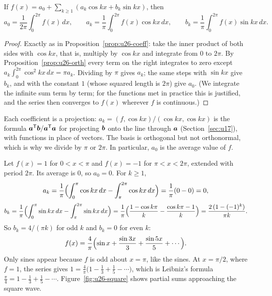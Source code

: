 \begin{theorem}\label{thm:u26-fourier}
If $f(x)=a_0+\sum_{k\ge1}(a_k\cos kx+b_k\sin kx)$, then
\[
  a_0=\frac{1}{2\pi}\int_0^{2\pi}f(x)\,dx,\qquad
  a_k=\frac1\pi\int_0^{2\pi}f(x)\cos kx\,dx,\qquad
  b_k=\frac1\pi\int_0^{2\pi}f(x)\sin kx\,dx .
\]
\end{theorem}

\begin{proof}
Exactly as in Proposition~\ref{prop:u26-coeff}: take the inner product of both sides with
$\cos kx$, that is, multiply by $\cos kx$ and integrate from $0$ to $2\pi$. By
Proposition~\ref{prop:u26-orth} every term on the right integrates to zero except
$a_k\int_0^{2\pi}\cos^{2}kx\,dx=\pi a_k$. Dividing by $\pi$ gives $a_k$; the same steps with
$\sin kx$ give $b_k$, and with the constant $1$ (whose squared length is $2\pi$) give $a_0$.
(We integrate the infinite sum term by term; for the functions met in practice this is
justified, and the series then converges to $f(x)$ wherever $f$ is continuous.)
\end{proof}

Each coefficient is a projection: $a_k=(f,\cos kx)/(\cos kx,\cos kx)$ is the formula
$\boldsymbol{a}^{\mathsf{T}}\boldsymbol{b}/\boldsymbol{a}^{\mathsf{T}}\boldsymbol{a}$ for projecting $\boldsymbol{b}$ onto the line through $\boldsymbol{a}$
(Section~\ref{sec:u17}), with functions in place of vectors. The basis is orthogonal but not
orthonormal, which is why we divide by $\pi$ or $2\pi$. In particular, $a_0$ is the average
value of $f$.

\begin{example}\label{ex:u26-square}
Let $f(x)=1$ for $0<x<\pi$ and $f(x)=-1$ for $\pi<x<2\pi$, extended with period $2\pi$. Its
average is $0$, so $a_0=0$. For $k\ge1$,
\[
  a_k=\frac1\pi\Bigl(\int_0^{\pi}\cos kx\,dx-\int_\pi^{2\pi}\cos kx\,dx\Bigr)=\frac1\pi(0-0)=0,
\]
\[
  b_k=\frac1\pi\Bigl(\int_0^{\pi}\sin kx\,dx-\int_\pi^{2\pi}\sin kx\,dx\Bigr)
  =\frac1\pi\Bigl(\frac{1-\cos k\pi}{k}-\frac{\cos k\pi-1}{k}\Bigr)
  =\frac{2\,(1-(-1)^{k})}{\pi k}.
\]
So $b_k=4/(\pi k)$ for odd $k$ and $b_k=0$ for even $k$:
\[
  f(x)=\frac4\pi\Bigl(\sin x+\frac{\sin3x}{3}+\frac{\sin5x}{5}+\cdots\Bigr).
\]
Only sines appear because $f$ is odd about $x=\pi$, like the sines. At $x=\pi/2$, where
$f=1$, the series gives $1=\tfrac4\pi\bigl(1-\tfrac13+\tfrac15-\cdots\bigr)$, which is Leibniz's
formula $\tfrac\pi4=1-\tfrac13+\tfrac15-\cdots$. Figure~\ref{fig:u26-square} shows partial
sums approaching the square wave.
\end{example}

